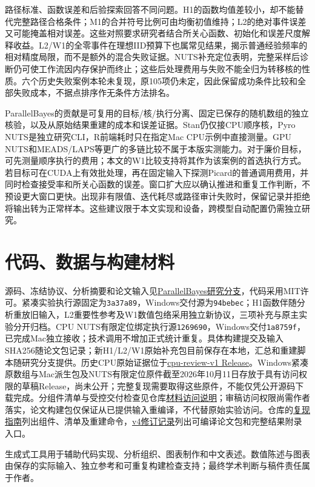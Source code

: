\documentclass[UTF8,fontset=fandol,zihao=-4]{ctexart}
\begin{document}
路径标准、函数误差和后验探索回答不同问题。H1的函数均值差较小，却不能替代完整路径合格条件；M1的合并符号比例可由均衡初值维持；L2的绝对事件误差又可能掩盖相对误差。这些对照要求研究者结合所关心函数、初始化和误差尺度解释收益。L2/W1的全零事件在理想IID预算下也属常见结果，揭示普通经验频率的相对精度局限，而不是额外的混合失败证据。NUTS补充定位表明，完整采样后诊断仍可使工作流因内存保护而终止；这些后处理费用与失败不能全归为转移核的性质。六个历史失败案例本轮未复现，原105项仍未定，因此保留成功条件比较和全部失败成本，不据点排序作无条件方法排名。

ParallelBayes的贡献是可复用的目标/核/执行分离、固定已保存的随机数组的独立核验，以及从原始结果重建的成本和误差证据。Stan仍仅接CPU顺序核，Pyro NUTS是独立研究CLI，R前端耗时只在指定Mac CPU示例中直接测量。GPU NUTS和MEADS/LAPS等更广的多链比较\cite{meads,laps,fsm}不属于本版实测能力。对于廉价目标，可先测量顺序执行的费用；本文的W1比较支持将其作为该案例的首选执行方式。若目标可在CUDA上有效批处理，再在固定输入下探测Picard的普通调用费用，并同时检查接受率和所关心函数的误差。窗口扩大应以确认推进和重复工作判断，不预设更大窗口更快。出现非有限值、迭代耗尽或路径审计失败时，保留记录并拒绝将输出转为正常样本。这些建议限于本文实现和设备，跨模型自动配置仍需独立研究。

\section*{代码、数据与构建材料}
源码、冻结协议、分析摘要和论文输入见\href{https://github.com/AlchemistXC/ParallelBayes/tree/codex/research-integration}{ParallelBayes研究分支}，代码采用MIT许可。紧凑实验执行源固定为\texttt{3a37a89}，Windows交付源为\texttt{94bebec}；H1函数伴随分析重放旧输入，L2重要性参考及W1数值包络采用独立新协议，三项补充与原主实验分开归档。CPU NUTS有限定位绑定执行源\texttt{1269690}，Windows交付\texttt{1a8759f}，已完成Mac独立接收；技术调用不增加正式统计重复。具体构建提交及输入SHA256随论文包记录；新H1/L2/W1原始补充包目前保存在本地，汇总和重建脚本随研究分支提供。历史CPU原始证据位于\href{https://github.com/AlchemistXC/ParallelBayes/releases/tag/cpu-review-v1}{cpu-review-v1 Release}。Windows紧凑原数组与Mac派生包及NUTS有限定位原件截至2026年10月11日存放于具有访问权限的草稿Release，尚未公开；完整复现需要取得这些原件，不能仅凭公开源码下载完成。分组件清单与受控交付检查见仓库\href{https://github.com/AlchemistXC/ParallelBayes/blob/codex/research-integration/docs/REVIEWER-ACCESS.md}{材料访问说明}；审稿访问权限尚需作者落实，论文构建包仅保证从已提供输入重编译，不代替原始实验访问。仓库的\href{https://github.com/AlchemistXC/ParallelBayes/blob/codex/research-integration/docs/COMPACT-REPRODUCTION.md}{复现指南}列出组件、清单及重建命令，\href{https://github.com/AlchemistXC/ParallelBayes/blob/codex/research-integration/docs/MANUSCRIPT-REVIEW-V3.md}{v4修订记录}列出可编译论文包和完整结果附录入口。

生成式工具用于辅助代码实现、分析组织、图表制作和中文表述。数值陈述与图表由保存的实际输入、独立参考和可重复构建检查支持；最终学术判断与稿件责任属于作者。


\end{document}
